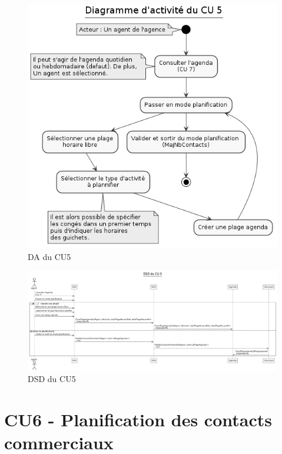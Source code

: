 \begin{figure}[H]
\centering
\includegraphics[width=\textwidth]{figures/DA_CU5.png}
\caption{DA du CU5}
\end{figure}

\begin{figure}[H]
\centering
\includegraphics[width=26cm, angle=90]{figures/DSD_CU5.png}
\caption{DSD du CU5}
\end{figure}

\clearpage
\section{CU6 - Planification des contacts commerciaux}

